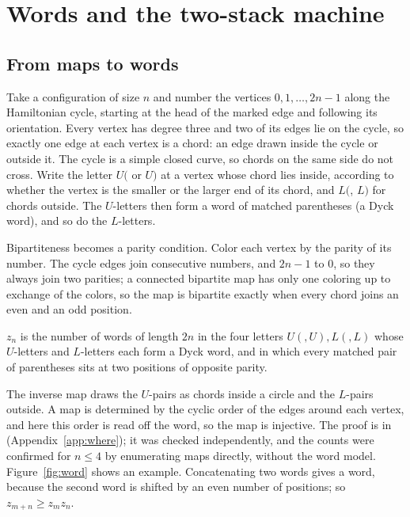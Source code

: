\section{Words and the two-stack machine}\label{sec:words}

\subsection{From maps to words}

Take a configuration of size $n$ and number the vertices $0,1,\ldots,2n-1$ along the Hamiltonian cycle, starting at
the head of the marked edge and following its orientation. Every vertex has degree three and two of its edges lie on
the cycle, so exactly one edge at each vertex is a chord: an edge drawn inside the cycle or outside it. The cycle is a
simple closed curve, so chords on the same side do not cross. Write the letter $U($ or $U)$ at a vertex whose chord
lies inside, according to whether the vertex is the smaller or the larger end of its chord, and $L($, $L)$ for chords
outside. The $U$-letters then form a word of matched parentheses (a Dyck word), and so do the $L$-letters.

Bipartiteness becomes a parity condition. Color each vertex by the parity of its number. The cycle edges join
consecutive numbers, and $2n-1$ to $0$, so they always join two parities; a connected bipartite map has only one
coloring up to exchange of the colors, so the map is bipartite exactly when every chord joins an even and an odd
position.

\begin{theorem}[Encoding]\label{thm:enc}
$z_n$ is the number of words of length $2n$ in the four letters $U(,U),L(,L)$ whose $U$-letters and $L$-letters each
form a Dyck word, and in which every matched pair of parentheses sits at two positions of opposite parity.
\end{theorem}

The inverse map draws the $U$-pairs as chords inside a circle and the $L$-pairs outside. A map is determined by the
cyclic order of the edges around each vertex, and here this order is read off the word, so the map is injective. The
proof is in~\cite{Repo} (Appendix~\ref{app:where}); it was checked independently, and the counts were confirmed for
$n\le4$ by enumerating maps directly, without the word model. Figure~\ref{fig:word} shows an example. Concatenating
two words gives a word, because the second word is shifted by an even number of positions; so $z_{m+n}\ge z_mz_n$.

